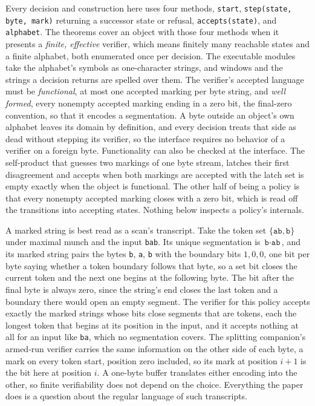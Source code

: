 \documentclass[11pt,a4paper]{article}
\theoremstyle{definition}
\theoremstyle{plain}
\newcommand{\code}[1]{\texttt{#1}}
\begin{document}
Every decision and construction here uses four methods, \code{start}, \code{step(state, byte, mark)} returning a
successor state or refusal, \code{accepts(state)}, and \code{alphabet}. The theorems cover an object with those four
methods when it presents a \emph{finite, effective} verifier, which means finitely many reachable states and a finite
alphabet, both enumerated once per decision. The executable modules take the alphabet's symbols as one-character
strings, and windows and the strings a decision returns are spelled over them. The verifier's accepted language must be
\emph{functional}, at most one accepted marking per byte string, and \emph{well formed}, every nonempty accepted marking
ending in a zero bit, the final-zero convention, so that it encodes a segmentation. A byte outside an object's own
alphabet leaves its domain by definition, and every decision treats that side as dead without stepping its verifier, so
the interface requires no behavior of a verifier on a foreign byte. Functionality can also be checked at the interface.
The self-product that guesses two markings of one byte stream, latches their first disagreement and accepts when both
markings are accepted with the latch set is empty exactly when the object is functional. The other half of being a
policy is that every nonempty accepted marking closes with a zero bit, which is read off the transitions into accepting
states. Nothing below inspects a policy's internals.

A marked string is best read as a scan's transcript. Take the token set $\{\code{ab}, \code{b}\}$ under maximal munch
and the input \code{bab}. Its unique segmentation is $\code{b} \cdot \code{ab}$, and its marked string pairs the bytes
\code{b}, \code{a}, \code{b} with the boundary bits $1, 0, 0$, one bit per byte saying whether a token boundary follows
that byte, so a set bit closes the current token and the next one begins at the following byte. The bit after the final
byte is always zero, since the string's end closes the last token and a boundary there would open an empty segment. The
verifier for this policy accepts exactly the marked strings whose bits close segments that are tokens, each the longest
token that begins at its position in the input, and it accepts nothing at all for an input like \code{ba}, which no
segmentation covers. The splitting companion's armed-run verifier carries the same information on the other side of each
byte, a mark on every token start, position zero included, so its mark at position $i+1$ is the bit here at position
$i$. A one-byte buffer translates either encoding into the other, so finite verifiability does not depend on the choice.
Everything the paper does is a question about the regular language of such transcripts.
\end{document}
